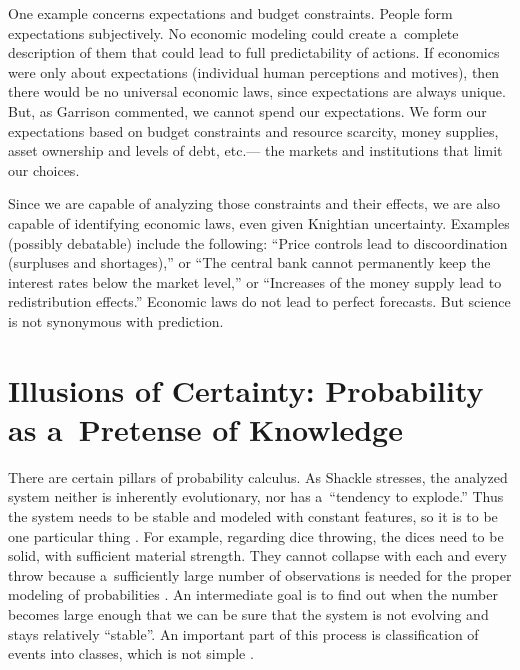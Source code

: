 One example concerns expectations and budget constraints. People form expectations subjectively. No economic modeling could create a~complete description of them that could lead to full predictability of actions. If economics were only about expectations (individual human perceptions and motives), then there would be no universal economic laws, since expectations are always unique. But, as Garrison 
\parencite[][p.9]{garrison_time_2001} %
 commented, we cannot spend our expectations. We form our expectations based on budget constraints and resource scarcity, money supplies, asset ownership and levels of debt, etc.--- the markets and institutions that limit our choices.



Since we are capable of analyzing those constraints and their effects, we are also capable of identifying economic laws, even given Knightian uncertainty. Examples (possibly debatable) include the following: ``Price controls lead to discoordination (surpluses and shortages),'' or ``The central bank cannot permanently keep the interest rates below the market level,'' or ``Increases of the money supply lead to redistribution effects.'' Economic laws do not lead to perfect forecasts. But science is not synonymous with prediction.



\section{Illusions of Certainty: Probability as a~Pretense of Knowledge}

There are certain pillars of probability calculus. As Shackle stresses, the analyzed system neither is inherently evolutionary, nor has a~``tendency to explode.'' Thus the system needs to be stable and modeled with constant features, so it is to be one particular thing 
\parencite[][p.381]{shackle_epistemics_1972}. %
 For example, regarding dice throwing, the dices need to be solid, with sufficient material strength. They cannot collapse with each and every throw because a~sufficiently large number of observations is needed for the proper modeling of probabilities 
\parencite[][p.91]{salmon_foundations_1967}. %
 An intermediate goal is to find out when the number becomes large enough that we can be sure that the system is not evolving and stays relatively ``stable''. An important part of this process is classification of events into classes, which is not simple 
\parencite[][pp.337–338]{swinburne_probability_1971}.%




